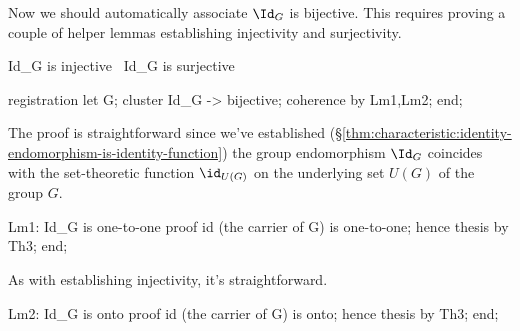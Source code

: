 \nwendcode{}\nwdocspar

\M
Now we should automatically associate $\Id_{G}$ is bijective. This
requires proving a couple of helper lemmas establishing injectivity and
surjectivity.

\nwenddocs{}\endmoddef\nwstartdeflinemarkup{}\nwenddeflinemarkup
\LA{}\code{}Id{\_}G\edoc{} is injective~{\nwtagstyle{}}\RA{}
\LA{}\code{}Id{\_}G\edoc{} is surjective~{\nwtagstyle{}}\RA{}

registration let G;
  cluster Id_G -> bijective;
  coherence by Lm1,Lm2;
end;

\nwendcode{}\nwdocspar

The proof is straightforward since we've established (\S\ref{thm:characteristic:identity-endomorphism-is-identity-function}) the group
endomorphism $\Id_{G}$ coincides with the set-theoretic function $\id_{U(G)}$
on the underlying set $U(G)$ of the group $G$.

\nwenddocs{}\endmoddef\nwstartdeflinemarkup{}\nwenddeflinemarkup
Lm1: Id_G is one-to-one
proof
  id (the carrier of G) is one-to-one;
  hence thesis by Th3;
end;

\nwendcode{}\nwdocspar

As with establishing injectivity, it's straightforward.

\nwenddocs{}\endmoddef\nwstartdeflinemarkup{}\nwenddeflinemarkup
Lm2: Id_G is onto
proof
  id (the carrier of G) is onto;
  hence thesis by Th3;
end;


